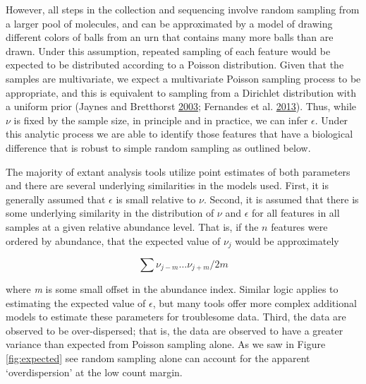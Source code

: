 \documentclass[onecolumn]{book}
\theoremstyle{definition}
\theoremstyle{definition}
\theoremstyle{definition}
\theoremstyle{remark}
\begin{document}
However, all steps in the collection and sequencing involve random
sampling from a larger pool of molecules, and can be approximated by a
model of drawing different colors of balls from an urn that contains
many more balls than are drawn. Under this assumption, repeated sampling
of each feature would be expected to be distributed according to a
Poisson distribution. Given that the samples are multivariate, we expect
a multivariate Poisson sampling process to be appropriate, and this is
equivalent to sampling from a Dirichlet distribution with a uniform
prior (Jaynes and Bretthorst \protect\hyperlink{ref-Jaynes:2003}{2003};
Fernandes et al. \protect\hyperlink{ref-fernandes:2013}{2013}). Thus,
while \(\nu\) is fixed by the sample size, in principle and in practice,
we can infer \(\epsilon\). Under this analytic process we are able to
identify those features that have a biological difference that is robust
to simple random sampling as outlined below.

The majority of extant analysis tools utilize point estimates of both
parameters and there are several underlying similarities in the models
used. First, it is generally assumed that \(\epsilon\) is small relative
to \(\nu\). Second, it is assumed that there is some underlying
similarity in the distribution of \(\nu\) and \(\epsilon\) for all
features in all samples at a given relative abundance level. That is, if
the \(n\) features were ordered by abundance, that the expected value of
\(\nu_j\) would be approximately

\begin{equation}
\sum \nu_{j-m} \ldots \nu_{j+m} / 2m
\end{equation}

where \textit{m} is some small offset in the abundance index. Similar
logic applies to estimating the expected value of \(\epsilon\), but many
tools offer more complex additional models to estimate these parameters
for troublesome data. Third, the data are observed to be over-dispersed;
that is, the data are observed to have a greater variance than expected
from Poisson sampling alone. As we saw in Figure \ref{fig:expected} see
random sampling alone can account for the apparent `overdispersion' at
the low count margin.
\end{document}
